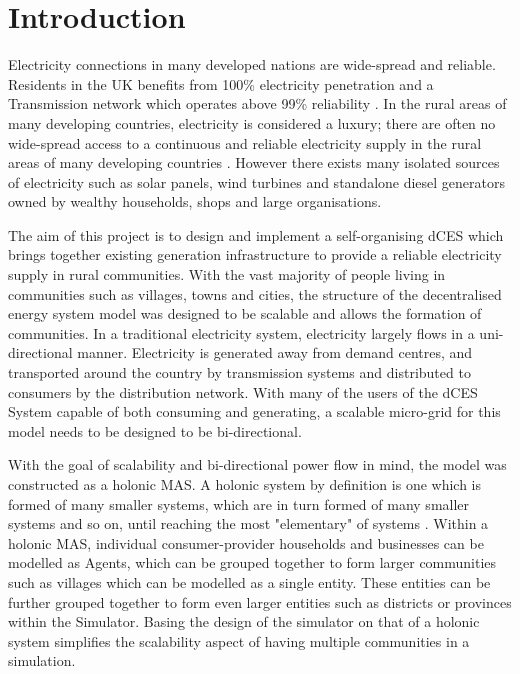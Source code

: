 \chapter{Introduction}
\label{introduction}

Electricity connections in many developed nations are wide-spread and reliable. Residents in the UK benefits from 100\% electricity penetration\cite{World-Bank-web:2015} and a Transmission network which operates above 99\% reliability \cite{NG-web:2015}. In the rural areas of many developing countries, electricity is considered a luxury; there are often no wide-spread access to a continuous and reliable electricity supply in the rural areas of many developing countries \cite{IEA-web:2015}. However there exists many isolated sources of electricity such as solar panels, wind turbines and standalone diesel generators owned by wealthy households, shops and large organisations. 

The aim of this project is to design and implement a self-organising \ac{dCES} which brings together existing generation infrastructure to provide a reliable electricity supply in rural communities. With the vast majority of people living in communities such as villages, towns and cities, the structure of the decentralised energy system model was designed to be scalable and allows the formation of communities. In a traditional electricity system, electricity largely flows in a uni-directional manner. Electricity is generated away from demand centres, and transported around the country by transmission systems and distributed to consumers by the distribution network. With many of the users of the dCES System capable of both consuming and generating, a scalable micro-grid for this model needs to be designed to be bi-directional.

With the goal of scalability and bi-directional power flow in mind, the model was constructed as a holonic \ac{MAS}. A holonic system by definition is one which is formed of many smaller systems, which are in turn formed of many smaller systems and so on, until reaching the most "elementary" of systems \cite{Pitt:Holonic_Institutions}. Within a holonic MAS, individual consumer-provider households and businesses can be modelled as Agents, which can be grouped together to form larger communities such as villages which can be modelled as a single entity. These entities can be further grouped together to form even larger entities such as districts or provinces within the Simulator. Basing the design of the simulator on that of a holonic system simplifies the scalability aspect of having multiple communities in a simulation. 

